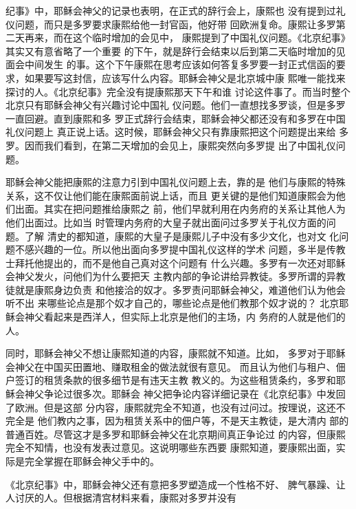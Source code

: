 纪事》中，耶稣会神父的记录也表明，在正式的辞行会上，康熙也%
没有提到过礼仪问题，而只是多罗要求康熙给他一封官函，他好带%
回欧洲复命。康熙让多罗第二天再来，而在这个临时增加的会见中，%
康熙提到了中国礼仪问题。《北京纪事》其实又有意省略了一个重要%
的下午，就是辞行会结束以后到第二天临时增加的见面会中间发生%
的事。这个下午康熙在思考应该如何答复多罗要一封正式信函的要%
求，如果要写这封信，应该写什么内容。耶稣会神父是北京城中康%
熙唯一能找来探讨的人。《北京纪事》完全没有提康熙那天下午和谁%
讨论这件事了。而当时整个北京只有耶稣会神父有兴趣讨论中国礼%
仪问题。他们一直想找多罗谈，但是多罗一直回避。直到康熙和多%
罗正式辞行会结束，耶稣会神父都还没有和多罗在中国礼仪问题上%
真正说上话。这时候，耶稣会神父只有靠康熙把这个问题提出来给%
多罗。因而我们看到，在第二天增加的会见上，康熙突然向多罗提%
出了中国礼仪问题。%
\par
耶稣会神父能把康熙的注意力引到中国礼仪问题上去，靠的是%
他们与康熙的特殊关系，这不仅让他们能在康熙面前说上话，而且%
更关键的是他们知道康熙会为他们出面。其实在把问题推给康熙之%
前，他们早就利用在内务府的关系让其他人为他们出面过。比如当%
时管理内务府的大皇子就出面问过多罗关于礼仪方面的问题。了解%
清史的都知道，康熙的大皇子是康熙儿子中没有多少文化，也对文%
化问题不感兴趣的一位。所以他出面向多罗提中国礼仪这样的学术%
问题，多半是传教士拜托他提出的，而不是他自己真对这个问题有%
什么兴趣。多罗有一次还对耶稣会神父发火，问他们为什么要把天%
主教内部的争论讲给异教徒。多罗所谓的异教徒就是康熙身边负责%
和他接洽的奴才。多罗责问耶稣会神父，难道他们认为他会听不出%
来哪些论点是那个奴才自己的，哪些论点是他们教那个奴才说的？%
北京耶稣会神父看起来是西洋人，但实际上北京是他们的主场，内%
务府的人就是他们的人。%
\par
同时，耶稣会神父不想让康熙知道的内容，康熙就不知道。比如，%
多罗对于耶稣会神父在中国买田置地、赚取租金的做法就很有意见。%
而且认为他们与租户、佃户签订的租赁条款的很多细节是有违天主教%
教义的。为这些租赁条约，多罗和耶稣会神父争论过很多次。耶稣会%
神父把争论内容详细记录在《北京纪事》中发回了欧洲。但是这部%
分内容，康熙就完全不知道，也没有过问过。按理说，这还不完全是%
他们教内之事，因为租赁关系中的佃户等，不是天主教徒，是大清内%
部的普通百姓。尽管这才是多罗和耶稣会神父在北京期间真正争论过%
的内容，但康熙完全不知情，也没有发表过意见。这说明哪些东西要%
康熙知道，要康熙出面，实际是完全掌握在耶稣会神父手中的。%
\par
《北京纪事》中，耶稣会神父还有意把多罗塑造成一个性格不好、%
脾气暴躁、让人讨厌的人。但根据清宫材料来看，康熙对多罗并没有%
